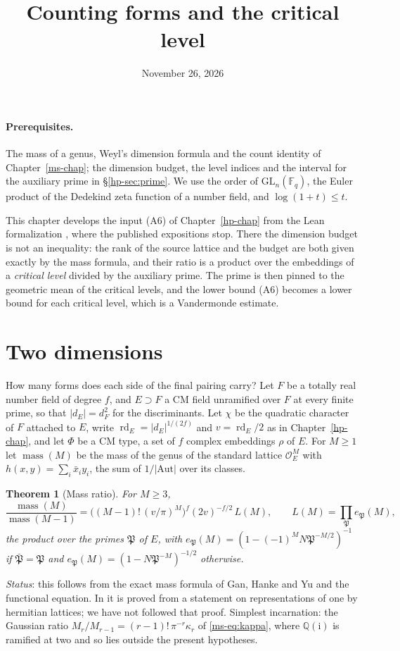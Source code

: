 \documentclass[reqno]{amsart}
\title{Counting forms and the critical level}
\author{}
\date{November 26, 2026}
\newcounter{chap}
\theoremstyle{definition}
\theoremstyle{plain}
\newtheorem{theorem}{Theorem}[section]
\theoremstyle{remark}
\newcommand{\mass}{\operatorname{mass}}
\newcommand{\rd}{\operatorname{rd}}
\newcommand{\GL}{\mathrm{GL}}
\newcommand{\F}{\mathbb{F}}
\begin{document}
\maketitle
{}\label{chap}

\paragraph{Prerequisites.}
The mass of a genus, Weyl's dimension formula and the count identity of
Chapter~\ref{ms-chap}; the dimension budget, the level indices and the
interval for the auxiliary prime in \S\ref{hp-sec:prime}.  We use the
order of $\GL_n(\F_q)$, the Euler product of the Dedekind zeta function
of a number field, and $\log(1+t)\le t$.

This chapter develops the input (A6) of Chapter~\ref{hp-chap} from the
Lean formalization \cite{Lean}, where the published expositions stop.
There the dimension budget is not an inequality: the rank of the source
lattice and the budget are both given exactly by the mass formula, and
their ratio is a product over the embeddings of a \emph{critical level}
divided by the auxiliary prime.  The prime is then pinned to the
geometric mean of the critical levels, and the lower bound (A6) becomes a
lower bound for each critical level, which is a Vandermonde estimate.

\section{Two dimensions}\label{sec:two}

How many forms does each side of the final pairing carry?  Let $F$ be a
totally real number field of degree $f$, and $E\supset F$ a CM field
unramified over $F$ at every finite prime, so that $|d_E|=d_F^2$ for the
discriminants.  Let $\chi$ be the quadratic character of $F$ attached
to $E$, write $\rd_E=|d_E|^{1/(2f)}$ and $v=\rd_E/2$ as in
Chapter~\ref{hp-chap}, and let $\Phi$ be a CM type, a set of $f$ complex
embeddings $\rho$ of $E$.  For $M\ge1$ let $\mass(M)$ be the mass of the
genus of the standard lattice $\mathcal O_E^M$ with
$h(x,y)=\sum_i\bar x_iy_i$, the sum of $1/|\mathrm{Aut}|$ over its classes.

\begin{theorem}[Mass ratio]\label{in:mass}
For $M\ge3$,
\[
 \frac{\mass(M)}{\mass(M-1)}
 =\bigl((M-1)!\,(v/\pi)^M\bigr)^f(2v)^{-f/2}\,L(M),
 \qquad L(M)=\prod_{\mathfrak P}e_{\mathfrak P}(M),
\]
the product over the primes $\mathfrak P$ of $E$, with
$e_{\mathfrak P}(M)=(1-(-1)^M N\mathfrak P^{-M/2})^{-1}$ if
$\bar{\mathfrak P}=\mathfrak P$ and
$e_{\mathfrak P}(M)=(1-N\mathfrak P^{-M})^{-1/2}$ otherwise.
\end{theorem}
\noindent\emph{Status}: this follows from the exact mass formula of Gan, Hanke and
Yu \cite{GHY} and the functional equation.  In \cite{Lean} it is proved
from a statement on representations of one by hermitian lattices; we have
not followed that proof.
Simplest incarnation: the Gaussian ratio
$M_r/M_{r-1}=(r-1)!\,\pi^{-r}\kappa_r$ of \eqref{ms-eq:kappa}, where
$\mathbb Q(\mathrm i)$ is ramified at two and so lies outside the present
hypotheses.
\end{document}
